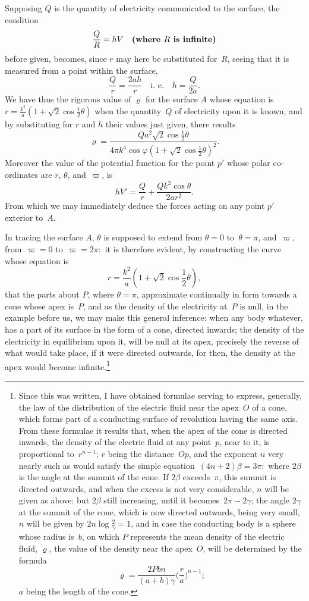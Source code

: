 \documentclass[11pt,notitlepage]{amsart}
\let\Emphasis\textbf
\renewcommand{\rho}{\varrho}
\renewcommand{\phi}{\varphi}
\begin{document}
Supposing $Q$ is the quantity of electricity communicated to the surface, the
condition
\[
\frac QR=hV\quad\text{\Emphasis{(where $R$ is infinite)}}
\]
before given, becomes, since $r$ may here be substituted for~$R$, seeing that
it is measured from a point within the surface,
\[
\frac Qr=\frac{2ah}{r}
\quad\text{i.~e.}\quad
h=\frac{Q}{2a}.
\]
We have thus the rigorous value of $\rho$ for the surface $A$ whose equation is
$r=\frac{k^2}{a}(1+\sqrt2\cos\frac12\theta)$
when the quantity~$Q$ of electricity upon it is known,
and by substituting for $r$ and $h$ their values just given, there results
\[
\rho=\frac{Qa^2\sqrt2\cos\frac12\theta}
{4\pi k^4\cos\phi(1+\sqrt2\cos\frac12\theta)^2}.
\]
Moreover the value of the potential function for the point $p'$
whose polar co-ordinates are $r$, $\theta$, and~$\varpi$, is
\[
hV'=\frac Qr+\frac{Qk^2\cos\theta}{2ar^2}.
\]
From which we may immediately deduce the forces acting on any point $p'$
exterior to~$A$.

In tracing the surface $A$,
$\theta$ is supposed to extend from $\theta=0$ to~$\theta=\pi$,
and~$\varpi$, from~$\varpi=0$ to~$\varpi=2\pi:$
it is therefore evident, by constructing the
curve whose equation is
\[
r=\frac{k^2}{a}(1+\sqrt2\cos\frac12\theta),
\]
that the parts about $P$, where $\theta=\pi$,
approximate continually in form towards
a cone whose apex is~$P$,
and as the density of the electricity at~$P$ is null,
in the example before us, we may make this general inference: when any
body whatever, has a part of its surface in the form of a cone, directed
inwards; the density of the electricity in equilibrium upon it,
will be null at its
apex, precisely the reverse of what would take place, if it were directed
outwards, for then, the density at the apex would become
infinite.\footnote{Since this was written,
I have obtained formulae serving to express, generally,
the law of the distribution of the
electric fluid near the apex~$O$ of a cone, which forms
part of a conducting surface of revolution
having the same axis. From these formulae
it results that, when the apex of the cone is
directed inwards, the density of the electric
fluid at any point~$p$, near to it,
is proportional to~$r^{n-1}$; $r$ being the distance~$Op$, and
the exponent $n$ very nearly such as would satisfy
the simple equation~${(4n+2)\beta=3\pi:}$
where $2\beta$ is the angle at the summit of the cone.
If $2\beta$ exceeds~$\pi$, this summit is directed
outwards, and when the excess is not very considerable,
$n$ will be given as above:
but $2\beta$ still increasing,
until it becomes~$2\pi-2\gamma$;
the angle $2\gamma$ at the summit of the cone,
which is now directed outwards, being very small,
$n$ will be given by $2n\log\frac2\gamma=1$,
and in case the conducting body is a sphere whose radius is~$b$,
on which $P$ represents
the mean density of the electric fluid,
$\rho$, the value of the density near the apex~$O$, will
be determined by the formula
\[
\rho=\frac{2Pbn}{(a+b)\gamma}\biggl(\frac ra\biggr)^{n-1};
\]
$a$ being the length of the cone.}
\end{document}
